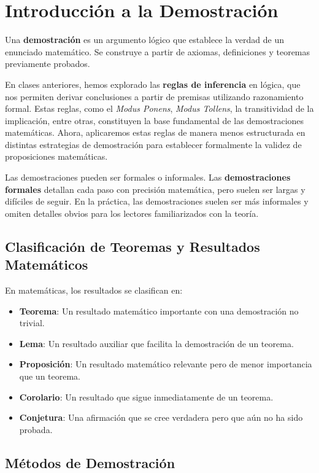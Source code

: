 \section{Introducción a la Demostración}
Una \textbf{demostración} es un argumento lógico que establece la verdad de un enunciado matemático.
Se construye a partir de axiomas, definiciones y teoremas previamente probados.

En clases anteriores, hemos explorado las \textbf{reglas de inferencia} en lógica, que nos permiten derivar conclusiones a partir de premisas utilizando razonamiento formal. Estas reglas, como el \textit{Modus Ponens}, \textit{Modus Tollens}, la transitividad de la implicación, entre otras, constituyen la base fundamental de las demostraciones matemáticas. Ahora, aplicaremos estas reglas de manera menos estructurada en distintas estrategias de demostración para establecer formalmente la validez de proposiciones matemáticas.

Las demostraciones pueden ser formales o informales. Las \textbf{demostraciones formales} detallan cada paso con precisión matemática, pero suelen ser largas y difíciles de seguir. En la práctica, las demostraciones suelen ser más informales y omiten detalles obvios para los lectores familiarizados con la teoría.

\subsection{Clasificación de Teoremas y Resultados Matemáticos}

En matemáticas, los resultados se clasifican en:

\begin{itemize}
    \item \textbf{Teorema}: Un resultado matemático importante con una demostración no trivial.
    \item \textbf{Lema}: Un resultado auxiliar que facilita la demostración de un teorema.
    \item \textbf{Proposición}: Un resultado matemático relevante pero de menor importancia que un teorema.
    \item \textbf{Corolario}: Un resultado que sigue inmediatamente de un teorema.
    \item \textbf{Conjetura}: Una afirmación que se cree verdadera pero que aún no ha sido probada.
\end{itemize}

\subsection{Métodos de Demostración}

